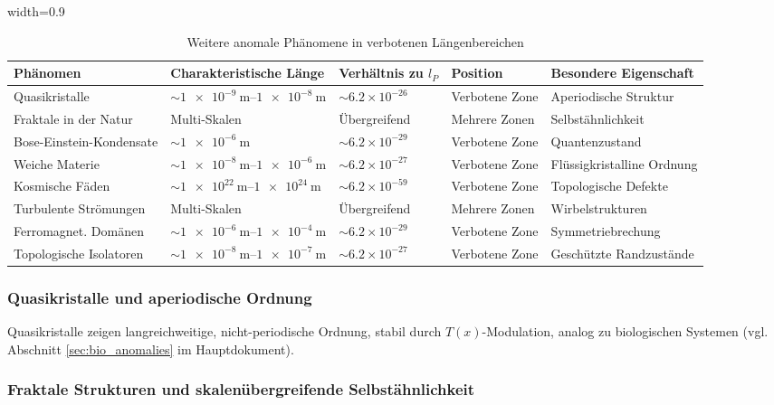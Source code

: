 \documentclass[12pt,a4paper]{article}
\newcommand{\Tfield}{T(x)}
\newcommand{\tablescale}{0.9}
\begin{document}
	\begin{table}[H]
		\centering
		\begin{adjustbox}{width=\tablescale\textwidth}
			\begin{tabular}{lllll}
				\toprule
				\textbf{Phänomen} & \textbf{Charakteristische Länge} & \textbf{Verhältnis zu $l_P$} & \textbf{Position} & \textbf{Besondere Eigenschaft} \\
				\midrule
				Quasikristalle & $\sim \SIrange{1e-9}{1e-8}{\meter}$ & $\sim 6.2 \times 10^{-26}$ & Verbotene Zone & Aperiodische Struktur \\
				Fraktale in der Natur & Multi-Skalen & Übergreifend & Mehrere Zonen & Selbstähnlichkeit \\
				Bose-Einstein-Kondensate & $\sim \SI{1e-6}{\meter}$ & $\sim 6.2 \times 10^{-29}$ & Verbotene Zone & Quantenzustand \\
				Weiche Materie & $\sim \SIrange{1e-8}{1e-6}{\meter}$ & $\sim 6.2 \times 10^{-27}$ & Verbotene Zone & Flüssigkristalline Ordnung \\
				Kosmische Fäden & $\sim \SIrange{1e22}{1e24}{\meter}$ & $\sim 6.2 \times 10^{-59}$ & Verbotene Zone & Topologische Defekte \\
				Turbulente Strömungen & Multi-Skalen & Übergreifend & Mehrere Zonen & Wirbelstrukturen \\
				Ferromagnet. Domänen & $\sim \SIrange{1e-6}{1e-4}{\meter}$ & $\sim 6.2 \times 10^{-29}$ & Verbotene Zone & Symmetriebrechung \\
				Topologische Isolatoren & $\sim \SIrange{1e-8}{1e-7}{\meter}$ & $\sim 6.2 \times 10^{-27}$ & Verbotene Zone & Geschützte Randzustände \\
				\bottomrule
			\end{tabular}
		\end{adjustbox}
		\caption{Weitere anomale Phänomene in verbotenen Längenbereichen}
		\label{tab:more_anomalies}
	\end{table}
	
	\subsubsection{Quasikristalle und aperiodische Ordnung}
	\label{subsubsec:quasikristalle}
	
	Quasikristalle zeigen langreichweitige, nicht-periodische Ordnung, stabil durch \(\Tfield\)-Modulation, analog zu biologischen Systemen (vgl. Abschnitt \ref{sec:bio_anomalies} im Hauptdokument).
	
	\subsubsection{Fraktale Strukturen und skalenübergreifende Selbstähnlichkeit}
	\label{subsubsec:fraktale_strukturen}
	
\end{document}
